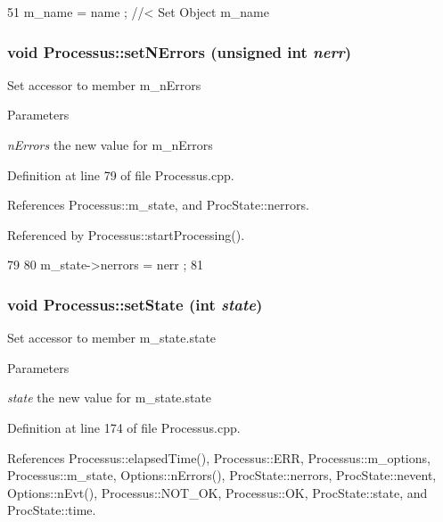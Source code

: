 \begin{DoxyCode}
51 { m_name  = name  ; } //< Set Object m_name
\end{DoxyCode}
\hypertarget{classProcessus_a831b027b9cf18ab56fa6147b5d3055da}{
\subsubsection[{setNErrors}]{\setlength{\rightskip}{0pt plus 5cm}void Processus::setNErrors (unsigned int {\em nerr})}}
\label{classProcessus_a831b027b9cf18ab56fa6147b5d3055da}
Set accessor to member m\_\-nErrors 
\begin{DoxyParams}{Parameters}
\item[{\em nErrors}]the new value for m\_\-nErrors \end{DoxyParams}


Definition at line 79 of file Processus.cpp.

References Processus::m\_\-state, and ProcState::nerrors.

Referenced by Processus::startProcessing().


\begin{DoxyCode}
79                                              {
80   m_state->nerrors = nerr ;
81 }
\end{DoxyCode}
\hypertarget{classProcessus_ad38cde0f1bcefa00b068e7947b8af927}{
\subsubsection[{setState}]{\setlength{\rightskip}{0pt plus 5cm}void Processus::setState (int {\em state})}}
\label{classProcessus_ad38cde0f1bcefa00b068e7947b8af927}
Set accessor to member m\_\-state.state 
\begin{DoxyParams}{Parameters}
\item[{\em state}]the new value for m\_\-state.state \end{DoxyParams}


Definition at line 174 of file Processus.cpp.

References Processus::elapsedTime(), Processus::ERR, Processus::m\_\-options, Processus::m\_\-state, Options::nErrors(), ProcState::nerrors, ProcState::nevent, Options::nEvt(), Processus::NOT\_\-OK, Processus::OK, ProcState::state, and ProcState::time.

